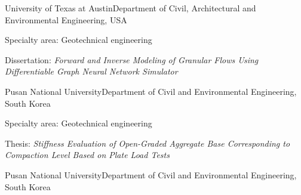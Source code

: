 
  {University of Texas at Austin}{Department of Civil, Architectural and Environmental Engineering, USA}
\begin{cvbullets}
  \item Specialty area: Geotechnical engineering
  \item Dissertation: \textit{Forward and Inverse Modeling of Granular Flows Using Differentiable Graph Neural Network Simulator}
\end{cvbullets}

  {Pusan National University}{Department of Civil and Environmental Engineering, South Korea}
\begin{cvbullets}
  \item Specialty area: Geotechnical engineering
  \item Thesis: \textit{Stiffness Evaluation of Open-Graded Aggregate Base Corresponding to Compaction Level Based on Plate Load Tests}
\end{cvbullets}

  {Pusan National University}{Department of Civil and Environmental Engineering, South Korea}
